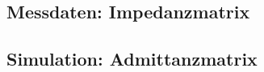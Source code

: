 %
\subsection{Messdaten: Impedanzmatrix}
\label{subsec:4_Daten}
%
%
%
%
%
%
%
%
%
\subsection{Simulation: Admittanzmatrix}
\label{subsec:4_simulation}
%
%
%
%
%
%
%
%
%